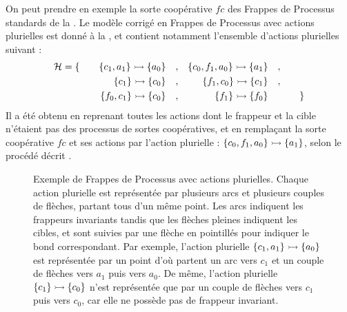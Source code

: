 \begin{example}
  On peut prendre en exemple 
  la sorte coopérative $fc$ des Frappes de Processus standards de la .
  Le modèle corrigé en Frappes de Processus avec actions plurielles
  est donné à la ,
  et contient notamment l'ensemble d'actions plurielles suivant :
  \begin{align*}
    \mathcal{H} = \{\qquad
      \mbox{$\{c_1, a_1\} \rightarrowtail \{a_0\}$}\quad, && \mbox{$\{c_0, f_1, a_0\} \rightarrowtail \{a_1\}$}\quad,& \\
      \mbox{$\{c_1\} \rightarrowtail \{c_0\}$}\quad, && \mbox{$\{f_1, c_0\} \rightarrowtail \{c_1\}$}\quad,& \\
      \mbox{$\{f_0, c_1\} \rightarrowtail \{c_0\}$}\quad,&& \mbox{$\{f_1\} \rightarrowtail \{f_0\}$}\quad\; &
    \qquad\}
  \end{align*}
  Il a été obtenu en reprenant toutes les actions dont le frappeur et la cible
  n'étaient pas des processus de sortes coopératives,
  et en remplaçant la sorte coopérative $fc$ et ses actions par l'action plurielle :
  $\mbox{$\{c_0, f_1, a_0\} \rightarrowtail \{a_1\}$}$,
  selon le procédé décrit .
  
  \begin{figure}[ht]
  \begin{center}
  \caption{%
    Exemple de Frappes de Processus avec actions plurielles.
    Chaque action plurielle est représentée par plusieurs arcs et plusieurs couples de flèches,
    partant tous d'un même point.
    Les arcs indiquent les frappeurs invariants
    tandis que les flèches pleines indiquent les cibles,
    et sont suivies par une flèche en pointillés pour indiquer le bond correspondant.
    Par exemple, l'action plurielle $\mbox{$\{c_1, a_1\} \rightarrowtail \{a_0\}$}$
    est représentée par un point d'où partent un arc vers $c_1$
    et un couple de flèches vers $a_1$ puis vers $a_0$.
    De même, l'action plurielle $\mbox{$\{c_1\} \rightarrowtail \{c_0\}$}$
    n'est représentée que par un couple de flèches vers $c_1$ puis vers $c_0$,
    car elle ne possède pas de frappeur invariant.
  }
  \end{center}
  \end{figure}
\end{example}



